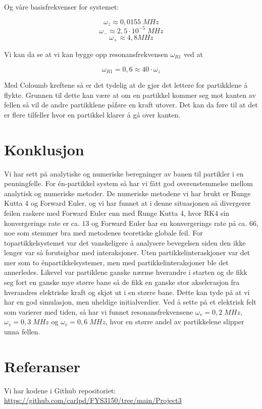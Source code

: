 \documentclass[reprint,english,notitlepage, nofootinbib]{revtex4-1}  %
\begin{document}
Og våre basisfrekvenser for systemet:

$$\omega_z \approx 0,0155 \; MHz$$
$$\omega_- \approx 2,5 \cdot 10^{-5} \; MHz$$
$$\omega_+ \approx 4,8 MHz$$

Vi kan da se at vi kan bygge opp resonansfrekvensen $\omega_{R1}$ ved at

$$\omega_{R1} = 0,6 \approx 40 \cdot \omega_z$$

Med Coloumb kreftene så er det tydelig at de gjør det lettere for partikklene å flykte. Grunnen til dette kan være at om en partikkel kommer seg mot kanten av fellen så vil de andre partikklene påføre en kraft utover. Det kan da føre til at det er flere tilfeller hvor en partikkel klarer å gå over kanten. 

\section{Konklusjon}

Vi har sett på analytiske og numeriske beregninger av banen til partikler i en penningfelle. For én-partikkel system så har vi fått god overenstemmelse mellom analytisk og numeriske metoder. De numeriske metodene vi har brukt er Runge Kutta 4 og Forward Euler, og vi har funnet at i denne situasjonen så divergerer feilen raskere med Forward Euler enn med Runge Kutta 4, hvor RK4 sin konvergerings rate er ca. $13$ og Forward Euler har en konvergerings rate på ca. $66$, noe som stemmer bra med metodenes teoretiske globale feil. For topartikkelsystemet var det vanskeligere å analysere bevegelsen siden den ikke lenger var så forutsigbar med interaksjoner. Uten partikkelinteraskjoner var det mer som to énpartikkelsystemer, men med partikkelinteraksjoner ble det annerledes. Likevel var partiklene ganske nærme hverandre i starten og de fikk seg fort en ganske mye større bane så de fikk en ganske stor akselerasjon fra hverandres elektriske kraft og skjøt ut i en større bane. Dette kan tyde på at vi har en god simulasjon, men uheldige initialverdier. Ved å sette på et elektrisk felt som varierer med tiden, så har vi funnet resonansfrekvensene $\omega_v = 0,2 \; MHz$, $\omega_v = 0,3 \; MHz$ og $\omega_v =  0,6 \; MHz$, hvor en større andel av partikkelene slipper unna fellen. 

\newpage
\section*{Referanser}

Vi har kodene i Github repositoriet: \url{https://github.com/carlpd/FYS3150/tree/main/Project3}
\newpage
\appendix
\end{document}
